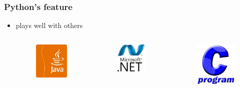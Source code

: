 \documentclass[compress=true]{beamer}
\begin{document}
\begin{frame}
	\frametitle{Python's feature}
	\begin{itemize}
		\item plays well with others
			\begin{columns}
				\begin{column}{0.333\textwidth}
					\begin{figure}
						\includegraphics[height=0.2\textheight]{java.png}
					\end{figure}
				\end{column}
				\begin{column}{0.333\textwidth}
					\begin{figure}
						\includegraphics[height=0.2\textheight]{dotnet.png}
					\end{figure}
				\end{column}
				\begin{column}{0.333\textwidth}
					\begin{figure}
						\includegraphics[height=0.2\textheight]{c.png}
					\end{figure}

\end{column}
\end{columns}
\end{itemize}
\end{frame}
\end{document}
